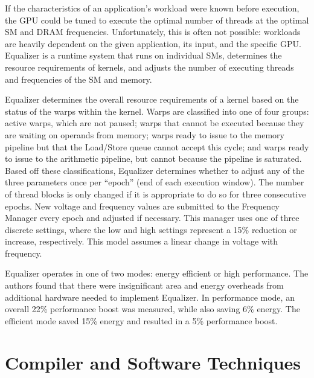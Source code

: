 \documentclass[prodmode,acmtecs]{acmsmall} %
\begin{document}
If the characteristics of an application's workload were known before execution,
the GPU could be tuned to execute the optimal number of threads at the optimal
SM and DRAM frequencies. Unfortunately, this is often not possible: workloads
are heavily dependent on the given application, its input, and the specific GPU.
Equalizer is a runtime system that runs on individual SMs, determines the
resource requirements of kernels, and adjusts the number of executing threads
and frequencies of the SM and memory.

Equalizer determines the overall resource requirements of a kernel based on the
status of the warps within the kernel. Warps are classified into one of four
groups: active warps, which are not paused; warps that cannot be executed
because they are waiting on operands from memory; warps ready to issue to the
memory pipeline but that the Load/Store queue cannot accept this cycle; and
warps ready to issue to the arithmetic pipeline, but cannot because the pipeline
is saturated. Based off these classifications, Equalizer determines whether to
adjust any of the three parameters once per ``epoch'' (end of each execution
window). The number of thread blocks is only changed if it is appropriate to do
so for three consecutive epochs. New voltage and frequency values are submitted
to the Frequency Manager every epoch and adjusted if necessary. This manager
uses one of three discrete settings, where the low and high settings represent a
15\% reduction or increase, respectively. This model assumes a linear change in
voltage with frequency.

Equalizer operates in one of two modes: energy efficient or high performance.
The authors found that there were insignificant area and energy overheads from
additional hardware needed to implement Equalizer. In performance mode, an
overall 22\% performance boost was measured, while also saving 6\% energy. The
efficient mode saved 15\% energy and resulted in a 5\% performance boost.

\section{Compiler and Software Techniques} \label{sec:software}
\end{document}
